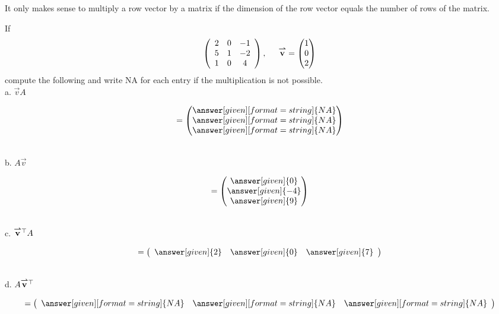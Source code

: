 \documentclass{ximera}
\begin{document}
\begin{warning}
  It only makes sense to multiply a row vector by a matrix if the
  dimension of the row vector equals the number of rows of the
  matrix.
\end{warning}


\begin{question}
If
\[
\left(\begin{array}{ccc}
2 & 0 & -1\\
5 & 1 & -2\\
1 & 0 & 4
\end{array}\right), \hspace{.5cm} \vec{v} = \begin{pmatrix}
1 \\
0\\
2
\end{pmatrix}
\]
compute the following and write NA for each entry if the multiplication is not possible. \\

a. $\vec{v} A$ \begin{prompt} \[=\begin{pmatrix}
\answer[given][format= string]{NA}\\
\answer[given][format= string]{NA}\\
\answer[given][format= string]{NA}
\end{pmatrix}\]
\end{prompt}\\

b. $A\vec{v}$ \begin{prompt} \[= \begin{pmatrix}
\answer[given]{0}\\
\answer[given]{-4}\\
\answer[given]{9}
\end{pmatrix}\]\end{prompt}\\

c. $\vec{v}^{\transpose} A$ \begin{prompt} \[= \left(\begin{array}{ccc}
\answer[given]{2} & \answer[given]{0} & \answer[given]{7}
\end{array}\right)\]
\end{prompt}\\

d. $A\vec{v}^{\transpose}$ \begin{prompt} \[= \left(\begin{array}{ccc}
\answer[given][format= string]{NA} & \answer[given][format= string]{NA} & \answer[given][format= string]{NA}
\end{array}\right)\]
\end{prompt}
\end{question}
\end{document}
